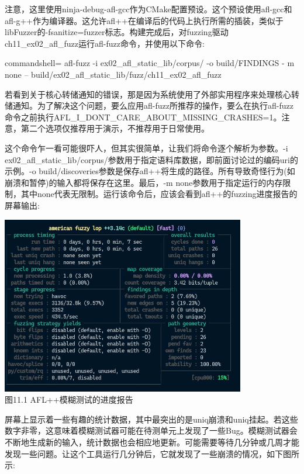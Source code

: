 注意，这里使用ninja-debug-afl-gcc作为CMake配置预设。这个预设使用afl-gcc和afl-g++作为编译器。这允许afl++在编译后的代码上执行所需的插装，类似于libFuzzer的-fsanitize=fuzzer标志。构建完成后，对fuzzing驱动ch11\_ex02\_afl\_fuzz运行afl-fuzz命令，并使用以下命令:

\begin{tcblisting}{commandshell={}}
afl-fuzz -i ex02_afl_static_lib/corpus/ -o build/FINDINGS -
m none -- build/ex02_afl_static_lib/fuzz/ch11_ex02_afl_fuzz
\end{tcblisting}

\begin{tcolorbox}[colback=blue!5!white,colframe=blue!75!black,title=重要的Note]
若看到关于核心转储通知的错误，那是因为系统使用了外部实用程序来处理核心转储通知。为了解决这个问题，要么应用afl-fuzz所推荐的操作，要么在执行afl-fuzz命令之前执行AFL\_I\_DONT\_CARE\_ABOUT\_MISSING\_CRASHES=1。注意，第二个选项仅推荐用于演示，不推荐用于日常使用。
\end{tcolorbox}

这个命令乍一看可能很吓人，但其实很简单，让我们将命令逐个解析为参数。-i ex02\_afl\_static\_lib/corpus/参数用于指定语料库数据，即前面讨论过的编码uri的示例。-o build/discoveries参数是保存afl++将生成的路径。所有导致奇怪行为(如崩溃和暂停)的输入都将保存在这里。最后，-m none参数用于指定运行的内存限制，其中none代表无限制。运行该命令后，应该会看到afl++的fuzzing进度报告的屏幕输出:

\begin{center}
\includegraphics[width=0.8\textwidth]{content/2/chapter11/images/1.jpg}\\
图11.1  AFL++模糊测试的进度报告
\end{center}

屏幕上显示着一些有趣的统计数据，其中最突出的是uniq崩溃和uniq挂起。若这些数字非零，这意味着模糊测试器可能在待测单元上发现了一些Bug。模糊测试器会不断地生成新的输入，统计数据也会相应地更新。可能需要等待几分钟或几周才能发现一些问题。让这个工具运行几分钟后，它就发现了一些崩溃的情况，如下图所示:

